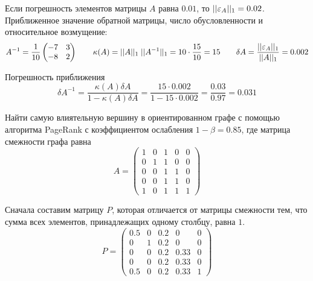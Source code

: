 Если погрешность элементов матрицы $A$ равна $0.01$, то $||\varepsilon_A||_1 = 0.02$.
Приближенное значение обратной матрицы, число обусловленности и относительное
возмущение:
\begin{equation*}
    A^{-1} = \frac{1}{10}
    \begin{pmatrix}
        -7 & 3\\
        -8 & 2
    \end{pmatrix}
    \qquad
    \kappa(A) = ||A||_1 \; ||A^{-1}||_1 =  10 \cdot \frac{15}{10} = 15
    \qquad
    \delta{A} = \frac{||\varepsilon_A||_1}{||A||_1} = 0.002
\end{equation*}

Погрешность приближения
\begin{equation*}
    \delta{A^{-1}} = \frac{\kappa(A) \delta{A}}{1 - \kappa(A) \delta{A}}
    =
    \frac{15\cdot{0.002}}{1-15\cdot{0.002}} = \frac{0.03}{0.97} = 0.031
\end{equation*}


\newpage
\begin{problem}
    Найти самую влиятельную вершину в ориентированном графе с помощью алгоритма
    PageRank с коэффициентом ослабления $1 - \beta = 0.85$, где матрица
    смежности графа равна
    \begin{equation*}
        A = \begin{pmatrix}
            1 & 0 & 1 & 0 & 0\\
            0 & 1 & 1 & 0 & 0\\
            0 & 0 & 1 & 1 & 0\\
            0 & 0 & 1 & 1 & 0\\
            1 & 0 & 1 & 1 & 1
        \end{pmatrix}
    \end{equation*}
\end{problem}

Сначала составим матрицу $P$, которая отличается от матрицы смежности тем, что
сумма всех элементов, принадлежащих одному столбцу, равна $1$.
\begin{equation*}
    P = \begin{pmatrix}
        0.5 & 0 & 0.2 & 0 & 0\\
        0 & 1 & 0.2 & 0 & 0\\
        0 & 0 & 0.2 & 0.33 & 0\\
        0 & 0 & 0.2 & 0.33 & 0\\
        0.5 & 0 & 0.2 & 0.33 & 1
    \end{pmatrix}
\end{equation*}

